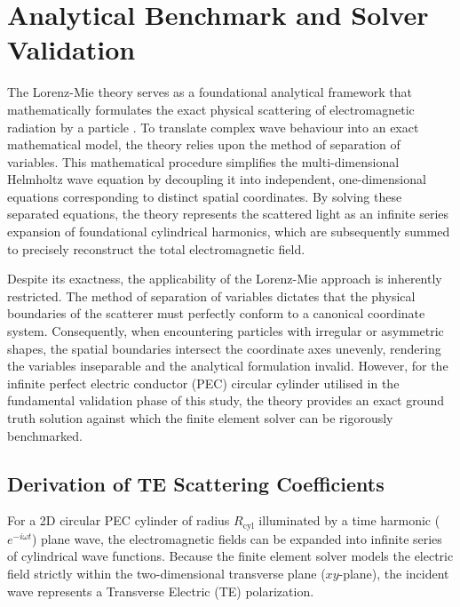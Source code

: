 \section{Analytical Benchmark and Solver Validation}

The Lorenz-Mie theory serves as a foundational analytical framework that mathematically formulates the exact physical scattering of electromagnetic radiation by a particle \citep{Wriedt2012}. To translate complex wave behaviour into an exact mathematical model, the theory relies upon the method of separation of variables. This mathematical procedure simplifies the multi-dimensional Helmholtz wave equation by decoupling it into independent, one-dimensional equations corresponding to distinct spatial coordinates. By solving these separated equations, the theory represents the scattered light as an infinite series expansion of foundational cylindrical harmonics, which are subsequently summed to precisely reconstruct the total electromagnetic field.

\vspace{12pt}

Despite its exactness, the applicability of the Lorenz-Mie approach is inherently restricted. The method of separation of variables dictates that the physical boundaries of the scatterer must perfectly conform to a canonical coordinate system. Consequently, when encountering particles with irregular or asymmetric shapes, the spatial boundaries intersect the coordinate axes unevenly, rendering the variables inseparable and the analytical formulation invalid. However, for the infinite perfect electric conductor (PEC) circular cylinder utilised in the fundamental validation phase of this study, the theory provides an exact ground truth solution against which the finite element solver can be rigorously benchmarked.

\subsection{Derivation of TE Scattering Coefficients}

For a 2D circular PEC cylinder of radius $R_{\text{cyl}}$ illuminated by a time harmonic ($e^{-i\omega t}$) plane wave, the electromagnetic fields can be expanded into infinite series of cylindrical wave functions. Because the finite element solver models the electric field strictly within the two-dimensional transverse plane ($xy$-plane), the incident wave represents a Transverse Electric (TE) polarization.

